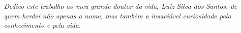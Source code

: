 \begin{titlepage}
\thispagestyle{empty}
\vspace*{\fill}

\begin{center}
  \itshape
  Dedico este trabalho ao meu grande doutor da vida, Luiz Silva dos Santos, de quem herdei não apenas o nome, mas também a insaciável curiosidade pelo conhecimento e pela vida.
\end{center}

\vspace*{3cm}
\end{titlepage}